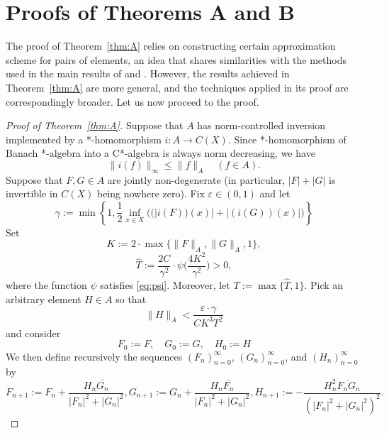 \documentclass[12pt,fleqn]{amsart}
\theoremstyle{definition}
\numberwithin{equation}{section}
\theoremstyle{remark}
\newcommand{\e}{\varepsilon}
\begin{document}
\section{Proofs of Theorems A and B}
The proof of Theorem~\ref{thm:A} relies on constructing certain approximation scheme for pairs of elements, an idea that shares similarities with the methods used in the main results of \cite{kowalczyk2019multiplication} and \cite{canarias2021multiplication}. However, the results achieved in Theorem~\ref{thm:A} are more general, and the techniques applied in its proof are correspondingly broader. Let us now proceed to the proof.

\begin{proof}[Proof of Theorem~\ref{thm:A}]
Suppose that $A$ has norm-controlled inversion implemented by a *-ho\-mo\-mor\-phism $i\colon A\to C(X)$. Since *-homomorphism of Banach *-algebra into a C*-algebra is always norm decreasing, we have
\begin{equation}\label{eq:local-0}
    \|i(f)\|_\infty \leqslant \|f\|_A\quad (f\in A).
\end{equation}
Suppose that $F,G\in A$ are jointly non-degenerate (in particular, $|F| + |G|$ is invertible in $C(X)$ being nowhere zero). Fix $\e\in(0,1)$ and let
\begin{equation}\label{eq:local-1}
    \gamma:=\min\left\{1,\frac{1}{2}\inf_{x\in X}
    \big((|i(F))(x)|+|(i(G))(x)|\big)\right\}
\end{equation}
Set
%
\begin{equation}\label{eq:local-2}
    K:=2\cdot\max\big\{\|F\|_A,\|G\|_A,1\big\},
\end{equation}
\begin{equation}
    \widehat{T}:= \frac{2C}{{\gamma}^2} \cdot \psi\bigg( \frac{4K^2}{{\gamma}^2}\bigg) > 0,
\end{equation}
where the function $\psi$ satisfies \eqref{eq:psi}. Moreover, let $  T:= \max \{\widehat{T}, 1\}.$ Pick an arbitrary element $H\in A$ so that
%
\begin{equation}\label{eq:local-3}
    \|H\|_{A}<\frac{\e \cdot \gamma}{C K^3 T^2}
\end{equation}
%
and consider
%
\begin{equation}\label{eq:local-4}
F_0:=F,\quad G_0:=G,\quad H_0:=H
\end{equation}
%
We then define recursively the sequences $(F_n)_{n=0}^\infty$, $(G_n)_{n=0}^\infty$, and
$(H_n)_{n=0}^\infty$ by
%
\begin{equation}\label{eq:local-5}
    F_{n+1} := F_n+\frac{H_n\overline{G_n}}{|F_n|^2+|G_n|^2}, G_{n+1} := G_n+\frac{H_n\overline{F_n}}{|F_n|^2+|G_n|^2}, H_{n+1} :=-\frac{H_n^2\overline{F_n G_n}}{(|F_n|^2+|G_n|^2)^2}.
\end{equation}


\end{proof}
\end{document}
